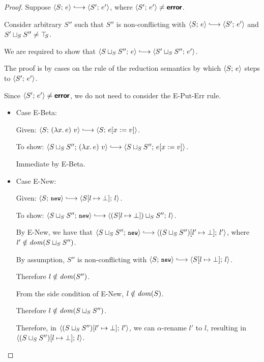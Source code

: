 \begin{proof}
  Suppose $\config{S}{e} \parstepsto \config{S'}{e'}$, where
  $\langle S';\, e' \rangle \neq \textbf{\textsf{error}}$.

  Consider arbitrary $S''$ such that $S''$ is non-conflicting with
  $\config{S}{e} \parstepsto \config{S'}{e'}$ and $S' \sqcup_{S} S''
  \neq \top\hspace{-0.85mm}_{S}$.

  We are required to show that $\config{\lubstore{S}{S''}}{e}
  \parstepsto \config{\lubstore{S'}{S''}}{e'}$.

  The proof is by cases on the rule of the reduction semantics by
  which $\langle S;\, e \rangle$ steps to $\langle S';\, e' \rangle$.

  Since $\langle S';\, e' \rangle \neq \textbf{\textsf{error}}$, we do not need to consider the
  {\sc E-Put-Err} rule.
  \begin{itemize}

  \item Case {\sc E-Beta}:

    Given: $\config{S}{\app{(\lam{x}{e})}{v}} \parstepsto
    \config{S}{\subst{e}{x}{v}}$.

    To show: $\config{\lubstore{S}{S''}}{\app{(\lam{x}{e})}{v}}
    \parstepsto \config{\lubstore{S}{S''}}{\subst{e}{x}{v}}$.

    Immediate by {\sc E-Beta}.

  \item Case {\sc E-New}:

    Given: $\config{S}{\NEW} \parstepsto
    \config{\extSRaw{S}{l}{\bot}}{l}$.

    To show: $\config{\lubstore{S}{S''}}{\NEW} \parstepsto
    \config{\lubstore{(\extSRaw{S}{l}{\bot})}{S''}}{l}$.

    By {\sc E-New}, we have that $\config{\lubstore{S}{S''}}{\NEW}
    \parstepsto \config{\extSRaw{(\lubstore{S}{S''})}{l'}{\bot}}{l'}$,
    where $l' \notin \mathit{dom}(S \sqcup_{S} S'')$.

    By assumption, $S''$ is non-conflicting with $\config{S}{\NEW}
    \parstepsto \config{\extSRaw{S}{l}{\bot}}{l}$.
    
    Therefore $l \notin \mathit{dom}(S'')$.

    From the side condition of {\sc E-New}, $l \notin \mathit{dom}(S)$.

    Therefore $l \notin \mathit{dom}(S \sqcup_{S} S'')$.

    Therefore, in
    $\langle (S \sqcup_{S} S'')[l' \mapsto \bot];\, l' \rangle$, we can
    $\alpha$-rename $l'$ to $l$, resulting in
    $\langle (S \sqcup_{S} S'')[l \mapsto \bot];\, l \rangle$.


\end{itemize}
\end{proof}
